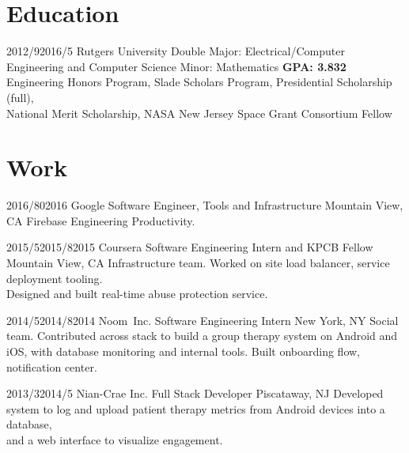 \documentclass[11pt,letterpaper]{moderncv}
\begin{document}
\maketitle

\section{Education}

\tlcventry
    {2012/9}{2016/5}
    {Rutgers University}
    {Double Major: Electrical/Computer Engineering and Computer Science}
    {Minor: Mathematics}
    {\textbf{GPA: 3.832}}
    {Engineering Honors Program, Slade Scholars Program, Presidential Scholarship (full),\\National Merit Scholarship, NASA New Jersey Space Grant Consortium Fellow}

\section{Work}

	\tllabelcventry
		{2016/8}{0}{2016}
		{Google}
		{Software Engineer, Tools and Infrastructure}
		{Mountain View, CA}
		{}
		{Firebase Engineering Productivity.}

    \tllabelcventry
        {2015/5}{2015/8}{2015}
        {Coursera}
        {Software Engineering Intern and KPCB Fellow}
        {Mountain View, CA}
        {}
        {Infrastructure team. Worked on site load balancer, service deployment tooling. \\Designed and built real-time abuse protection service. \\}

    \tllabelcventry
        {2014/5}{2014/8}{2014}
        {Noom~Inc.}
        {Software Engineering Intern}
        {New York, NY}
        {}
        {Social team. Contributed across stack to build a group therapy system on Android and iOS, with database monitoring and internal tools. Built onboarding flow, notification center.\\}

    \tlcventry
        {2013/3}{2014/5}
        {Nian-Crae Inc.}
        {Full Stack Developer}
        {Piscataway, NJ}
        {}
        {Developed system to log and upload patient therapy metrics from Android devices into a database,\\and a web interface to visualize engagement.\\}

\end{document}
